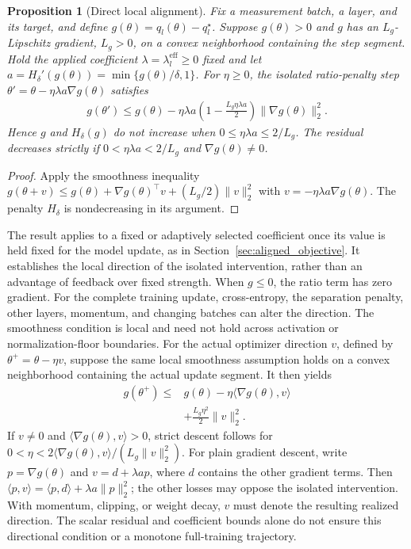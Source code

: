\documentclass[10pt,a4paper,twocolumn]{article}
\newtheorem{proposition}{Proposition}
\begin{document}
\begin{samepage}
\begin{proposition}[Direct local alignment]\label{prop:local}
Fix a measurement batch, a layer, and its target, and define
$g(\theta)=q_l(\theta)-q_l^\star$. Suppose $g(\theta)>0$ and
$g$ has an $L_g$-Lipschitz gradient, $L_g>0$, on a convex
neighborhood containing the step segment. Hold the applied
coefficient $\lambda=\lambda_l^{\mathrm{eff}}\ge0$ fixed and let
$a=H_\delta'(g(\theta))=\min\{g(\theta)/\delta,1\}$.
For $\eta\ge0$, the isolated ratio-penalty step
$\theta'=\theta-\eta\lambda a\nabla g(\theta)$ satisfies
\begin{align}
 g(\theta')\le g(\theta)
 -\eta\lambda a
 \left(1-\frac{L_g\eta\lambda a}{2}\right)
 \|\nabla g(\theta)\|_2^2.
 \label{eq:alignment_bound}
\end{align}
Hence $g$ and $H_\delta(g)$ do not increase when
$0\le\eta\lambda a\le2/L_g$. The residual decreases strictly
if $0<\eta\lambda a<2/L_g$ and $\nabla g(\theta)\ne0$.
\end{proposition}
\par
\end{samepage}
\begin{proof}
Apply the smoothness inequality
$g(\theta+v)\le g(\theta)+\nabla g(\theta)^\top v
+(L_g/2)\|v\|_2^2$
with $v=-\eta\lambda a\nabla g(\theta)$.
The penalty $H_\delta$ is nondecreasing in its argument.
\end{proof}

The result applies to a fixed or adaptively selected coefficient
once its value is held fixed for the model update, as in
Section~\ref{sec:aligned_objective}. It establishes the local
direction of the isolated intervention, rather than an advantage
of feedback over fixed strength. When $g\le0$, the ratio term
has zero gradient. For the complete training update,
cross-entropy, the separation penalty, other layers, momentum,
and changing batches can alter the direction. The smoothness
condition is local and need not hold across activation or
normalization-floor boundaries. For the actual optimizer direction $v$,
defined by $\theta^+=\theta-\eta v$, suppose the same local smoothness
assumption holds on a convex neighborhood containing the actual update
segment. It then yields
\begin{equation}
\begin{aligned}
g(\theta^+)\le{}&g(\theta)-\eta\langle\nabla g(\theta),v\rangle\\
&+\frac{L_g\eta^2}{2}\|v\|_2^2.
\end{aligned}
\label{eq:complete_update_residual_bound}
\end{equation}
If $v\ne0$ and $\langle\nabla g(\theta),v\rangle>0$, strict
descent follows for
$0<\eta<2\langle\nabla g(\theta),v\rangle/(L_g\|v\|_2^2)$.
For plain gradient descent, write $p=\nabla g(\theta)$ and
$v=d+\lambda a p$, where $d$ contains the other gradient terms.
Then $\langle p,v\rangle=\langle p,d\rangle+\lambda a\|p\|_2^2$;
the other losses may oppose the isolated intervention. With momentum,
clipping, or weight decay, $v$ must denote the resulting realized
direction. The scalar residual and coefficient bounds alone do not
ensure this directional condition or a monotone full-training trajectory.
\end{document}
